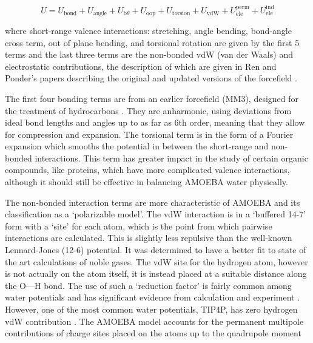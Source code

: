 \begin{equation}
    U = U_{\mathrm{bond}} + U_{\mathrm{angle}} + U_{\mathrm{b}\theta} + U_{\mathrm{oop}} + U_{\mathrm{torsion}}
    + U_{\mathrm{vdW}} + U^{\mathrm{perm}}_{\mathrm{ele}} + U^{\mathrm{ind}}_{\mathrm{ele}}
    \label{eq:amoeba}
\end{equation}

where short-range valence interactions: stretching, angle bending,
bond-angle cross term, out of plane bending, and torsional rotation are given by the first 5 terms
and the last three terms are the non-bonded vdW (van der Waals) and electrostatic contributions,
the description of which are given in Ren and Ponder's papers describing the original and updated versions of the
forcefield \cite{ren2003,ponder2010}.

\par
The first four bonding terms are from an earlier forcefield (MM3), designed for the treatment of hydrocarbons
\cite{allinger1989}.
They are anharmonic, using deviations from ideal bond lengths and angles up to as far as 6th order,
meaning that they allow for compression and expansion.
The torsional term is in the form of a Fourier expansion which smooths the potential in between the short-range and 
non-bonded interactions. 
This term has greater impact in the study of certain organic compounds, like proteins, which have more complicated
valence interactions, although it should still be effective in balancing AMOEBA water physically.

\par
The non-bonded interaction terms are more characteristic of AMOEBA and its classification as a `polarizable model'.
The vdW interaction is in a `buffered 14-7' form with a `site' for each atom, which is the point from which pairwise
interactions are calculated.
This is slightly less repulsive than the well-known Lennard-Jones (12-6) potential.
It was determined to have a better fit to state of the art calculations of noble gases.
The vdW site for the hydrogen atom, however is not actually on the atom itself, it is instead placed at 
a suitable distance along the O---H bond.
The use of such a `reduction factor' is fairly common among water potentials and has significant evidence from
calculation and experiment \cite{stewart1965}. 
However, one of the most common water potentials, TIP4P, has zero hydrogen vdW contribution \cite{abascal2005}.
The AMOEBA model accounts for the permanent multipole contributions of charge sites placed on the
atoms up to the quadrupole moment

